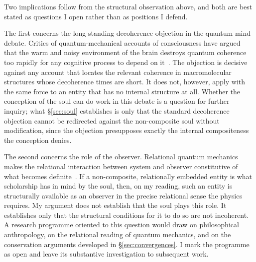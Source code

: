 Two implications follow from the structural observation above, and both are
best stated as questions I open rather than as positions I defend.

The first concerns the long-standing decoherence objection in the quantum
mind debate.
Critics of quantum-mechanical accounts of consciousness have argued that the
warm and noisy environment of the brain destroys quantum coherence too rapidly
for any cognitive process to depend on it~\citep{Zurek2003}.
The objection is decisive against any account that locates the relevant
coherence in macromolecular structures whose decoherence times are short.
It does not, however, apply with the same force to an entity that has no
internal structure at all.
Whether the \bahai conception of the soul can do work in this debate is a
question for further inquiry; what \S\ref{sec:soul} establishes is only that
the standard decoherence objection cannot be redirected against the
non-composite soul without modification, since the objection presupposes
exactly the internal compositeness the \bahai conception denies.

The second concerns the role of the observer.
Relational quantum mechanics makes the relational interaction between system
and observer constitutive of what becomes definite~\citep{Rovelli1996}.
If a non-composite, relationally embedded entity is what \bahai scholarship
has in mind by the soul, then, on my reading, such an entity is structurally available as an
observer in the precise relational sense the physics requires.
My argument does not establish that the soul plays this role.
It establishes only that the structural conditions for it to do so are not
incoherent.
A research programme oriented to this question would draw on \bahai
philosophical anthropology, on the relational reading of quantum mechanics,
and on the conservation arguments developed in \S\ref{sec:convergences}.
I mark the programme as open and leave its substantive investigation to
subsequent work.
